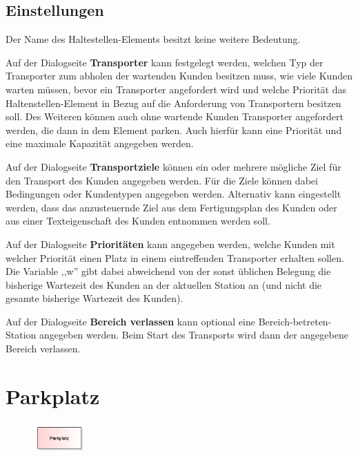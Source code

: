 \subsection*{Einstellungen}

Der Name des Haltestellen-Elements besitzt keine weitere Bedeutung.

Auf der Dialogseite \textbf{Transporter} kann festgelegt werden, welchen
Typ der Transporter zum abholen der wartenden Kunden besitzen muss,
wie viele Kunden warten müssen, bevor ein Transporter angefordert wird
und welche Priorität das Haltenstellen-Element in Bezug auf die
Anforderung von Transportern besitzen soll.
Des Weiteren können auch ohne wartende Kunden Transporter angefordert
werden, die dann in dem Element parken. Auch hierfür kann eine Priorität
und eine maximale Kapazität angegeben werden.

Auf der Dialogseite \textbf{Transportziele} können ein oder mehrere
mögliche Ziel für den Transport des Kunden angegeben werden. Für die Ziele können dabei
Bedingungen oder Kundentypen angegeben werden. Alternativ kann eingestellt werden, dass
das anzusteuernde Ziel aus dem Fertigungsplan des Kunden oder aus einer Texteigenschaft
des Kunden entnommen werden soll.

Auf der Dialogseite \textbf{Prioritäten} kann angegeben werden, welche
Kunden mit welcher Priorität einen Platz in einem eintreffenden
Transporter erhalten sollen.
Die Variable ,,w'' gibt dabei abweichend von der sonst üblichen Belegung die bisherige
Wartezeit des Kunden an der aktuellen Station an (und nicht die gesamte bisherige
Wartezeit des Kunden).

Auf der Dialogseite \textbf{Bereich verlassen} kann optional eine
Bereich-betreten-Station angegeben werden. Beim Start des Transports
wird dann der angegebene Bereich verlassen.


\section{Parkplatz}
\label{ref:ModelElementTransportParking}

\begin{figure}
\vspace{-22pt}
\includegraphics[width=2cm]{imageModelElementTransportParking.png}
\vspace{-22pt}
\end{figure}

